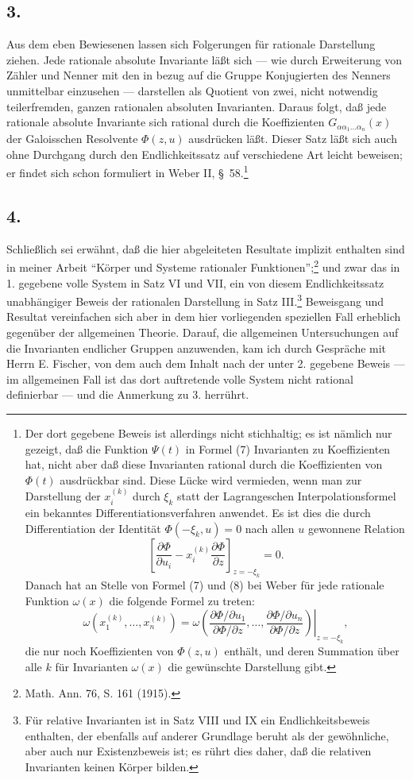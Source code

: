 \documentclass[11pt]{article}
\begin{document}
\subsection*{3.}
Aus dem eben Bewiesenen lassen sich Folgerungen für rationale Darstellung ziehen. Jede rationale absolute Invariante läßt sich --- wie durch Erweiterung von Zähler und Nenner mit den in bezug auf die Gruppe Konjugierten des Nenners unmittelbar einzusehen --- darstellen als Quotient von zwei, nicht notwendig teilerfremden, ganzen rationalen absoluten Invarianten. Daraus folgt, daß jede rationale absolute Invariante sich rational durch die Koeffizienten $G_{\alpha\alpha_1\ldots\alpha_n}(x)$ der Galoisschen Resolvente $\Phi(z,u)$ ausdrücken läßt. Dieser Satz läßt sich auch ohne Durchgang durch den Endlichkeitssatz auf verschiedene Art leicht beweisen; er findet sich schon formuliert in Weber II, \S\ 58.\footnote{Der dort gegebene Beweis ist allerdings nicht stichhaltig; es ist nämlich nur gezeigt, daß die Funktion $\Psi(t)$ in Formel (7) Invarianten zu Koeffizienten hat, nicht aber daß diese Invarianten rational durch die Koeffizienten von $\Phi(t)$ ausdrückbar sind. Diese Lücke wird vermieden, wenn man zur Darstellung der $x_i^{(k)}$ durch $\xi_k$ statt der Lagrangeschen Interpolationsformel ein bekanntes Differentiationsverfahren anwendet. Es ist dies die durch Differentiation der Identität $\Phi(-\xi_k,u)=0$ nach allen $u$ gewonnene Relation
\[
 \left[\frac{\partial\Phi}{\partial u_i}
      -x_i^{(k)}\frac{\partial\Phi}{\partial z}\right]_{z=-\xi_k}=0.
\]
Danach hat an Stelle von Formel (7) und (8) bei Weber für jede rationale Funktion $\omega(x)$ die folgende Formel zu treten:
\[
 \omega(x_1^{(k)},\ldots,x_n^{(k)})=
 \left.
 \omega\!\left(
   \frac{\partial\Phi/\partial u_1}{\partial\Phi/\partial z},\ldots,
   \frac{\partial\Phi/\partial u_n}{\partial\Phi/\partial z}
 \right)\right|_{z=-\xi_k},
\]
die nur noch Koeffizienten von $\Phi(z,u)$ enthält, und deren Summation über alle $k$ für Invarianten $\omega(x)$ die gewünschte Darstellung gibt.}

\subsection*{4.}
Schließlich sei erwähnt, daß die hier abgeleiteten Resultate implizit enthalten sind in meiner Arbeit ``Körper und Systeme rationaler Funktionen'';\footnote{Math. Ann. 76, S. 161 (1915).} und zwar das in 1. gegebene volle System in Satz VI und VII, ein von diesem Endlichkeitssatz unabhängiger Beweis der rationalen Darstellung in Satz III.\footnote{Für relative Invarianten ist in Satz VIII und IX ein Endlichkeitsbeweis enthalten, der ebenfalls auf anderer Grundlage beruht als der gewöhnliche, aber auch nur Existenzbeweis ist; es rührt dies daher, daß die relativen Invarianten keinen Körper bilden.} Beweisgang und Resultat vereinfachen sich aber in dem hier vorliegenden speziellen Fall erheblich gegenüber der allgemeinen Theorie. Darauf, die allgemeinen Untersuchungen auf die Invarianten endlicher Gruppen anzuwenden, kam ich durch Gespräche mit Herrn E. Fischer, von dem auch dem Inhalt nach der unter 2. gegebene Beweis --- im allgemeinen Fall ist das dort auftretende volle System nicht rational definierbar --- und die Anmerkung zu 3. herrührt.
\end{document}
